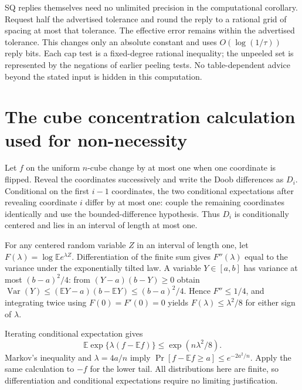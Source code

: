 \documentclass[11pt]{article}
\newcommand{\E}{\mathbb E}
\newcommand{\1}{\mathbf 1}
\begin{document}
SQ replies themselves need no unlimited precision in the computational corollary. Request half the advertised tolerance and round the reply to a rational grid of spacing at most that tolerance. The effective error remains within the advertised tolerance. This changes only an absolute constant and uses $O(\log(1/\tau))$ reply bits. Each cap test is a fixed-degree rational inequality; the unpeeled set is represented by the negations of earlier peeling tests. No table-dependent advice beyond the stated input is hidden in this computation.



\section{The cube concentration calculation used for non-necessity}\label{app:concentration}
Let $f$ on the uniform $n$-cube change by at most one when one coordinate is flipped. Reveal the coordinates successively and write the Doob differences as $D_i$. Conditional on the first $i-1$ coordinates, the two conditional expectations after revealing coordinate $i$ differ by at most one: couple the remaining coordinates identically and use the bounded-difference hypothesis. Thus $D_i$ is conditionally centered and lies in an interval of length at most one.

For any centered random variable $Z$ in an interval of length one, let $F(\lambda)=\log\E e^{\lambda Z}$. Differentiation of the finite sum gives $F''(\lambda)$ equal to the variance under the exponentially tilted law. A variable $Y\in[a,b]$ has variance at most $(b-a)^2/4$: from $(Y-a)(b-Y)\ge0$ obtain $\operatorname{Var}(Y)\le(\E Y-a)(b-\E Y)\le(b-a)^2/4$. Hence $F''\le1/4$, and integrating twice using $F(0)=F'(0)=0$ yields $F(\lambda)\le\lambda^2/8$ for either sign of $\lambda$.

Iterating conditional expectation gives
\[
 \E\exp\{\lambda(f-\E f)\}\le\exp(n\lambda^2/8).
\]
Markov's inequality and $\lambda=4a/n$ imply $\Pr[f-\E f\ge a]\le e^{-2a^2/n}$. Apply the same calculation to $-f$ for the lower tail. All distributions here are finite, so differentiation and conditional expectations require no limiting justification.



\end{document}
